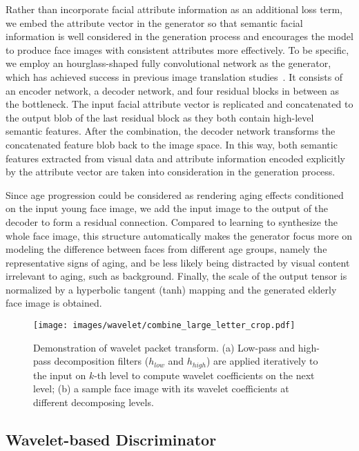 \documentclass[letterpaper]{article} %
\begin{document}
Rather than incorporate facial attribute information as an additional loss term, we embed the attribute vector in the generator so that semantic facial information is well considered in the generation process and encourages the model to produce face images with consistent attributes more effectively. 
To be specific, we employ an hourglass-shaped fully convolutional network as the generator, which has achieved success in previous image translation studies~\cite{johnson2016perceptual,zhu2017unpaired,yang2017learning}. It consists of an encoder network, a decoder network, and four residual blocks in between as the bottleneck.
The input facial attribute vector is replicated and concatenated to the output blob of the last residual block as they both contain high-level semantic features. After the combination, the decoder network transforms the concatenated feature blob back to the image space. 
In this way, both semantic features extracted from visual data and attribute information encoded explicitly by the attribute vector are taken into consideration in the generation process.

Since age progression could be considered as rendering aging effects conditioned on the input young face image, we add the input image to the output of the decoder to form a residual connection. 
Compared to learning to synthesize the whole face image, this structure automatically makes the generator focus more on modeling the difference between faces from different age groups, namely the representative signs of aging, and be less likely being distracted by visual content irrelevant to aging, such as background.
Finally, the scale of the output tensor is normalized by a hyperbolic tangent (tanh) mapping and the generated elderly face image is obtained.

\begin{figure}[t]
\centering\texttt{[image: images/wavelet/combine\_large\_letter\_crop.pdf]}
\caption{Demonstration of wavelet packet transform. (a) Low-pass and high-pass decomposition filters ($h_{low}$ and $h_{high}$) are applied iteratively to the input on $k$-th level to compute wavelet coefficients on the next level; (b) a sample face image with its wavelet coefficients at different decomposing levels.} 
\label{fig:waveletPacketTransform}
\end{figure}

\subsection{Wavelet-based Discriminator}
\end{document}

